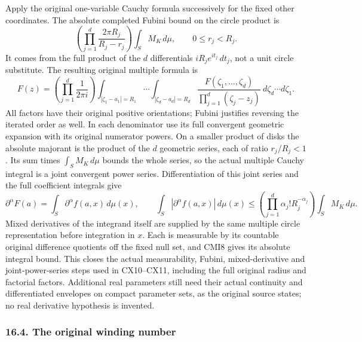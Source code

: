 \documentclass[
  11pt,
]{article}
\makeatletter
\let\ReaderOriginalAnchorStart\hyper@anchorstart
\let\ReaderOriginalAnchorEnd\hyper@anchorend
\let\ReaderPendingAliases\@empty
\def\ReaderArmAliases#1{\gdef\ReaderPendingAliases{#1}}
\def\hyper@anchorstart#1{\ReaderIfNativeAnchorTF{#1}{\ReaderPendingAliases\global\let\ReaderPendingAliases\@empty}{}\ReaderOriginalAnchorStart{#1}}
\makeatother
\begin{document}
Apply the original one-variable Cauchy formula successively for the
fixed other coordinates. The absolute completed Fubini bound on the
circle product is \[
\left(\prod_{j=1}^d\frac{2\pi R_j}{R_j-r_j}\right)
\int_S M_K\,d\mu,\qquad 0\leq r_j<R_j .
\tag{CMI6}
\] It comes from the full product of the \(d\) differentials
\(iR_je^{it_j}\,dt_j\), not a unit circle substitute. The resulting
original multiple formula is \[
F(z)=\left(\prod_{j=1}^d\frac1{2\pi i}\right)
\int_{|\zeta_1-a_1|=R_1}\cdots
\int_{|\zeta_d-a_d|=R_d}
\frac{F(\zeta_1,\ldots,\zeta_d)}
     {\prod_{j=1}^d(\zeta_j-z_j)}
\ d\zeta_d\cdots d\zeta_1 .
\tag{CMI7}
\] All factors have their original positive orientations; Fubini
justifies reversing the iterated order as well. In each denominator use
its full convergent geometric expansion with its original numerator
powers. On a smaller product of disks the absolute majorant is the
product of the \(d\) geometric series, each of ratio \(r_j/R_j<1\). Its
sum times \(\int_S M_K\,d\mu\) bounds the whole series, so the actual
multiple Cauchy integral is a joint convergent power series.
Differentiation of this joint series and the full coefficient integrals
give \[
\partial^\alpha F(a)
=\int_S\partial^\alpha f(a,x)\,d\mu(x),\qquad
\int_S|\partial^\alpha f(a,x)|\,d\mu(x)
\leq
\left(\prod_{j=1}^d\alpha_j!R_j^{-\alpha_j}\right)
\int_S M_K\,d\mu .
\tag{CMI8}
\] Mixed derivatives of the integrand itself are supplied by the same
multiple circle representation before integration in \(x\). Each is
measurable by its countable original difference quotients off the fixed
null set, and CMI8 gives its absolute integral bound. This closes the
actual measurability, Fubini, mixed-derivative and joint-power-series
steps used in CX10--CX11, including the full original radius and
factorial factors. Additional real parameters still need their actual
continuity and differentiated envelopes on compact parameter sets, as
the original source states; no real derivative hypothesis is invented.

\ReaderArmAliases{\ReaderOriginalAnchorStart{AN03-CN-COMPLEX-004}\ReaderOriginalAnchorEnd\begingroup\expandafter\def\csname @currentHref\endcsname{AN03-CN-COMPLEX-004}\label{AN03-CN-COMPLEX-004}\endgroup\ReaderOriginalAnchorStart{the-original-winding-number}\ReaderOriginalAnchorEnd}
\subsubsection{16.4. The original winding
number}\label{the-original-winding-number}
\end{document}
